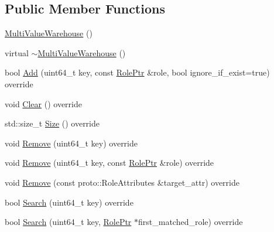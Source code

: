 \subsection*{Public Member Functions}
\begin{DoxyCompactItemize}
\item 
\hyperlink{classapollo_1_1cyber_1_1service__discovery_1_1MultiValueWarehouse_ab137a895871b0a5e9742bb38fea6db7f}{Multi\-Value\-Warehouse} ()
\item 
virtual \hyperlink{classapollo_1_1cyber_1_1service__discovery_1_1MultiValueWarehouse_ae1e7e62f8d412dcc5ec93edc94c6fe2f}{$\sim$\-Multi\-Value\-Warehouse} ()
\item 
bool \hyperlink{classapollo_1_1cyber_1_1service__discovery_1_1MultiValueWarehouse_accd3db47b675921fd1ac27c224467069}{Add} (uint64\-\_\-t key, const \hyperlink{namespaceapollo_1_1cyber_1_1service__discovery_a47c65bbb4b41d9ae41bfbd33271df525}{Role\-Ptr} \&role, bool ignore\-\_\-if\-\_\-exist=true) override
\item 
void \hyperlink{classapollo_1_1cyber_1_1service__discovery_1_1MultiValueWarehouse_a78118000cb24fb6899cb4dc2f46023de}{Clear} () override
\item 
std\-::size\-\_\-t \hyperlink{classapollo_1_1cyber_1_1service__discovery_1_1MultiValueWarehouse_a7fb59c1ab79ba957b0da337ec4488d49}{Size} () override
\item 
void \hyperlink{classapollo_1_1cyber_1_1service__discovery_1_1MultiValueWarehouse_ac96d1a2faf4b62343c565b282d03f036}{Remove} (uint64\-\_\-t key) override
\item 
void \hyperlink{classapollo_1_1cyber_1_1service__discovery_1_1MultiValueWarehouse_ac61b78aa52c1b7115d19ca6a5a419f0b}{Remove} (uint64\-\_\-t key, const \hyperlink{namespaceapollo_1_1cyber_1_1service__discovery_a47c65bbb4b41d9ae41bfbd33271df525}{Role\-Ptr} \&role) override
\item 
void \hyperlink{classapollo_1_1cyber_1_1service__discovery_1_1MultiValueWarehouse_a50032c7ce957cf1d2508b43b6fcf73e2}{Remove} (const proto\-::\-Role\-Attributes \&target\-\_\-attr) override
\item 
bool \hyperlink{classapollo_1_1cyber_1_1service__discovery_1_1MultiValueWarehouse_a0d4f03663bf91e70c7b44570085a989b}{Search} (uint64\-\_\-t key) override
\item 
bool \hyperlink{classapollo_1_1cyber_1_1service__discovery_1_1MultiValueWarehouse_a6381d4cd1a9b4290ca5b2fafd7238226}{Search} (uint64\-\_\-t key, \hyperlink{namespaceapollo_1_1cyber_1_1service__discovery_a47c65bbb4b41d9ae41bfbd33271df525}{Role\-Ptr} $\ast$first\-\_\-matched\-\_\-role) override

\end{DoxyCompactItemize}
